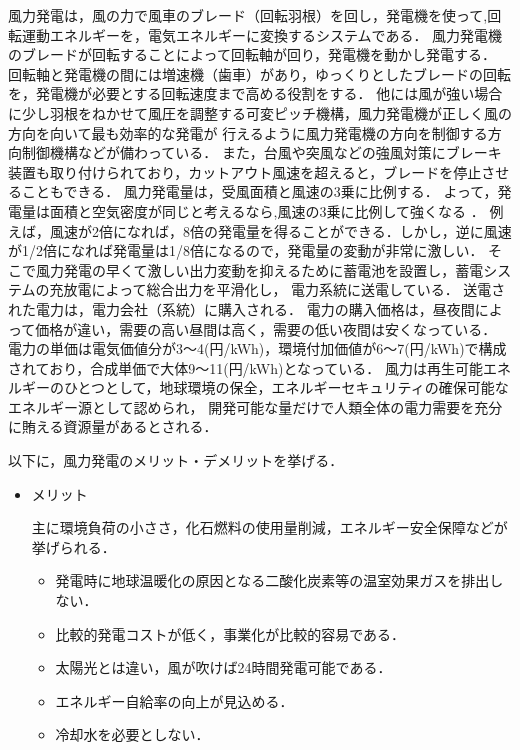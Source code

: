 \documentclass[a4paper,12pt,showkeys]{jreport}
\begin{document}
風力発電は，風の力で風車のブレード（回転羽根）を回し，発電機を使って,回転運動エネルギーを，電気エネルギーに変換するシステムである．
風力発電機のブレードが回転することによって回転軸が回り，発電機を動かし発電する．
回転軸と発電機の間には増速機（歯車）があり，ゆっくりとしたブレードの回転を，発電機が必要とする回転速度まで高める役割をする．
他には風が強い場合に少し羽根をねかせて風圧を調整する可変ピッチ機構，風力発電機が正しく風の方向を向いて最も効率的な発電が
行えるように風力発電機の方向を制御する方向制御機構などが備わっている．
また，台風や突風などの強風対策にブレーキ装置も取り付けられており，カットアウト風速を超えると，ブレードを停止させることもできる．
風力発電量は，受風面積と風速の3乗に比例する．
よって，発電量は面積と空気密度が同じと考えるなら,風速の3乗に比例して強くなる \cite{牛山}．
例えば，風速が2倍になれば，8倍の発電量を得ることができる．しかし，逆に風速が1/2倍になれば発電量は1/8倍になるので，発電量の変動が非常に激しい．
そこで風力発電の早くて激しい出力変動を抑えるために蓄電池を設置し，蓄電システムの充放電によって総合出力を平滑化し，
電力系統に送電している．
送電された電力は，電力会社（系統）に購入される．
電力の購入価格は，昼夜間によって価格が違い，需要の高い昼間は高く，需要の低い夜間は安くなっている．
電力の単価は電気価値分が3～4(円/kWh)，環境付加価値が6～7(円/kWh)で構成されており，合成単価で大体9～11(円/kWh)となっている．
風力は再生可能エネルギーのひとつとして，地球環境の保全，エネルギーセキュリティの確保可能なエネルギー源として認められ，
開発可能な量だけで人類全体の電力需要を充分に賄える資源量があるとされる．

以下に，風力発電のメリット・デメリットを挙げる．
\begin{itemize}
\item メリット

主に環境負荷の小ささ，化石燃料の使用量削減，エネルギー安全保障などが挙げられる．

\begin{itemize}
\item 発電時に地球温暖化の原因となる二酸化炭素等の温室効果ガスを排出しない．

\item 比較的発電コストが低く，事業化が比較的容易である．

\item 太陽光とは違い，風が吹けば24時間発電可能である．

\item エネルギー自給率の向上が見込める．

\item 冷却水を必要としない．
\end{itemize}
\end{itemize}
\end{document}
